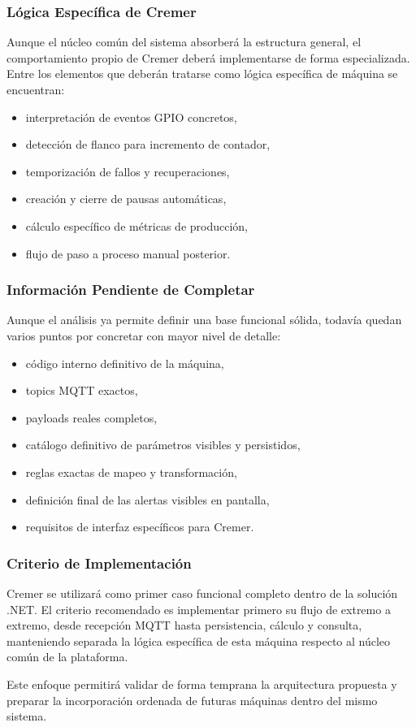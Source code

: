 \subsubsection{Lógica Específica de Cremer}

Aunque el núcleo común del sistema absorberá la estructura general, el comportamiento propio de Cremer deberá implementarse de forma especializada. Entre los elementos que deberán tratarse como lógica específica de máquina se encuentran:

\begin{itemize}
    \item interpretación de eventos GPIO concretos,
    \item detección de flanco para incremento de contador,
    \item temporización de fallos y recuperaciones,
    \item creación y cierre de pausas automáticas,
    \item cálculo específico de métricas de producción,
    \item flujo de paso a proceso manual posterior.
\end{itemize}

\subsubsection{Información Pendiente de Completar}

Aunque el análisis ya permite definir una base funcional sólida, todavía quedan varios puntos por concretar con mayor nivel de detalle:

\begin{itemize}
    \item código interno definitivo de la máquina,
    \item topics MQTT exactos,
    \item payloads reales completos,
    \item catálogo definitivo de parámetros visibles y persistidos,
    \item reglas exactas de mapeo y transformación,
    \item definición final de las alertas visibles en pantalla,
    \item requisitos de interfaz específicos para Cremer.
\end{itemize}

\subsubsection{Criterio de Implementación}

Cremer se utilizará como primer caso funcional completo dentro de la solución .NET. El criterio recomendado es implementar primero su flujo de extremo a extremo, desde recepción MQTT hasta persistencia, cálculo y consulta, manteniendo separada la lógica específica de esta máquina respecto al núcleo común de la plataforma.

Este enfoque permitirá validar de forma temprana la arquitectura propuesta y preparar la incorporación ordenada de futuras máquinas dentro del mismo sistema.